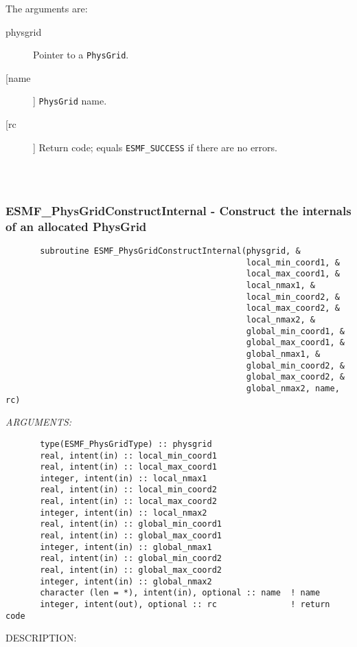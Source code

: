        The arguments are:
       \begin{description}
       \item[physgrid] 
            Pointer to a {\tt PhysGrid}.
       \item[[name]] 
            {\tt PhysGrid} name.
       \item[[rc]] 
            Return code; equals {\tt ESMF\_SUCCESS} if there are no errors.
       \end{description}
  
\begin{verbatim} \end{verbatim}
 
 
\mbox{}\hrulefill\ 
 
\subsubsection{ESMF\_PhysGridConstructInternal - Construct the internals of an allocated PhysGrid}


\begin{verbatim}       subroutine ESMF_PhysGridConstructInternal(physgrid, &
                                                 local_min_coord1, &
                                                 local_max_coord1, &
                                                 local_nmax1, &
                                                 local_min_coord2, &
                                                 local_max_coord2, &
                                                 local_nmax2, &
                                                 global_min_coord1, &
                                                 global_max_coord1, &
                                                 global_nmax1, &
                                                 global_min_coord2, &
                                                 global_max_coord2, &
                                                 global_nmax2, name, rc)\end{verbatim}{\em ARGUMENTS:}
\begin{verbatim}       type(ESMF_PhysGridType) :: physgrid  
       real, intent(in) :: local_min_coord1
       real, intent(in) :: local_max_coord1
       integer, intent(in) :: local_nmax1
       real, intent(in) :: local_min_coord2
       real, intent(in) :: local_max_coord2
       integer, intent(in) :: local_nmax2
       real, intent(in) :: global_min_coord1
       real, intent(in) :: global_max_coord1
       integer, intent(in) :: global_nmax1
       real, intent(in) :: global_min_coord2
       real, intent(in) :: global_max_coord2
       integer, intent(in) :: global_nmax2
       character (len = *), intent(in), optional :: name  ! name
       integer, intent(out), optional :: rc               ! return code\end{verbatim}
{\sf DESCRIPTION:\\ }


